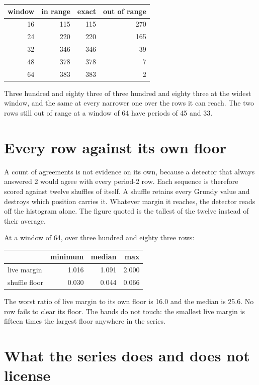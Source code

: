 \begin{center}
\begin{tabular}{@{}rrrr@{}}
\toprule
window & in range & exact & out of range \\
\midrule
16 & 115 & 115 & 270 \\
24 & 220 & 220 & 165 \\
32 & 346 & 346 & 39 \\
48 & 378 & 378 & 7 \\
64 & 383 & 383 & 2 \\
\bottomrule
\end{tabular}
\end{center}

Three hundred and eighty three of three hundred and eighty three at the widest window, and the same
at every narrower one over the rows it can reach. The two rows still out of range at a window of 64
have periods of 45 and 33.

\section{Every row against its own floor}

A count of agreements is not evidence on its own, because a detector that always answered 2 would
agree with every period-2 row. Each sequence is therefore scored against twelve shuffles of itself.
A shuffle retains every Grundy value and destroys which position carries it. Whatever margin it
reaches, the detector reads off the histogram alone. The figure quoted is the tallest of the
twelve instead of their average.

At a window of 64, over three hundred and eighty three rows:

\begin{center}
\begin{tabular}{@{}lrrr@{}}
\toprule
 & minimum & median & max \\
\midrule
live margin & 1.016 & 1.091 & 2.000 \\
shuffle floor & 0.030 & 0.044 & 0.066 \\
\bottomrule
\end{tabular}
\end{center}

The worst ratio of live margin to its own floor is 16.0 and the median is 25.6. No row fails to
clear its floor. The bands do not touch: the smallest live margin is fifteen times the largest
floor anywhere in the series.

\section{What the series does and does not license}

